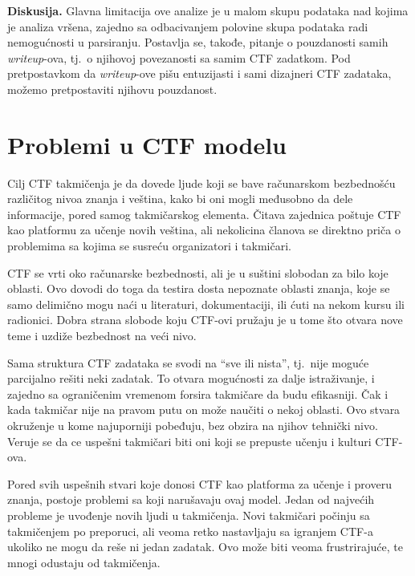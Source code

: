 \documentclass[12pt, a4paper, twocolumn]{article}
\begin{document}
\textbf{Diskusija.} Glavna limitacija ove analize je u malom skupu podataka 
nad kojima je analiza vršena, zajedno sa odbacivanjem polovine skupa podataka 
radi nemogućnosti u parsiranju.\cite{ctf_skills} Postavlja se, takođe, pitanje o 
pouzdanosti samih \emph{writeup}-ova, tj.\ o njihovoj povezanosti sa samim
CTF zadatkom. Pod pretpostavkom da \emph{writeup}-ove pišu entuzijasti i sami
dizajneri CTF zadataka, možemo pretpostaviti njihovu pouzdanost.

\section{Problemi u CTF modelu}

Cilj CTF takmičenja je da dovede ljude koji se bave računarskom bezbednošću
različitog nivoa znanja i veština, kako bi oni mogli međusobno da dele
informacije, pored samog takmičarskog elementa. Čitava zajednica poštuje
CTF kao platformu za učenje novih veština, ali nekolicina članova se direktno
priča o problemima sa kojima se susreću organizatori i takmičari.

CTF se vrti oko računarske bezbednosti, ali je u suštini slobodan za bilo koje
oblasti. Ovo dovodi do toga da testira dosta nepoznate oblasti znanja, koje
se samo delimično mogu naći u literaturi, dokumentaciji, ili ćuti na nekom 
kursu ili radionici. Dobra strana slobode koju CTF-ovi pružaju je u tome
što otvara nove teme i uzdiže bezbednost na veći nivo. 

Sama struktura CTF zadataka se svodi na ``sve ili nista'', tj.\ nije moguće
parcijalno rešiti neki zadatak. To otvara mogućnosti za dalje istraživanje, i
zajedno sa ograničenim vremenom forsira takmičare da budu efikasniji. Čak i
kada takmičar nije na pravom putu on može naučiti o nekoj oblasti. Ovo stvara
okruženje u kome najuporniji pobeđuju, bez obzira na njihov tehnički nivo.
Veruje se da ce uspešni takmičari biti oni koji se prepuste učenju i kulturi
CTF-ova.

Pored svih uspešnih stvari koje donosi CTF kao platforma za učenje i proveru
znanja, postoje problemi sa koji narušavaju ovaj model. Jedan od najvećih
probleme je uvođenje novih ljudi u takmičenja.\cite{ctf_chung} Novi takmičari
počinju sa takmičenjem po preporuci, ali veoma retko nastavljaju sa igranjem
CTF-a ukoliko ne mogu da reše ni jedan zadatak. Ovo može biti veoma 
frustrirajuće, te mnogi odustaju od takmičenja.
\end{document}
